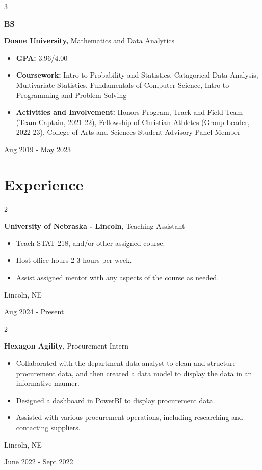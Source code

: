 \documentclass[10pt, letterpaper]{article}
\newenvironment{highlights}{
    \begin{itemize}[
        topsep=0.10 cm,
        parsep=0.10 cm,
        partopsep=0pt,
        itemsep=0pt,
        leftmargin=0.4 cm + 10pt
    ]
}{
    \end{itemize}
} %
\newenvironment{twocolentry}[2][]{
    \onecolentry
    \def\secondColumn{#2}
    \setcolumnwidth{\fill, 4.5 cm}
    \begin{paracol}{2}
}{
    \switchcolumn \raggedleft \secondColumn
    \end{paracol}
    \endonecolentry
} %
\newenvironment{threecolentry}[3][]{
    \onecolentry
    \def\thirdColumn{#3}
    \setcolumnwidth{1 cm, \fill, 4.5 cm}
    \begin{paracol}{3}
    {\raggedright #2} \switchcolumn
}{
    \switchcolumn \raggedleft \thirdColumn
    \end{paracol}
    \endonecolentry
} %
\begin{document}
        \vspace{0.2 cm}

                \begin{threecolentry}{\textbf{BS}}{
            Aug 2019 - May 2023
        }
            \textbf{Doane University, }Mathematics and Data Analytics
            \begin{highlights}
                \item \textbf{GPA:} 3.96/4.00
                \item \textbf{Coursework:} Intro to Probability and Statistics, Catagorical Data Analysis, Multivariate Statistics, Fundamentals of Computer Science, Intro to Programming and Problem Solving
                \item \textbf{Activities and Involvement:} Honors Program, Track and Field Team (Team Captain, 2021-22), Fellowship of Christian Athletes (Group Leader, 2022-23), College of Arts and Sciences Student Advisory Panel Member
            \end{highlights}
        \end{threecolentry}


    
    \section{Experience}

        \begin{twocolentry}{
            Lincoln, NE

        Aug 2024 - Present
        }
            \textbf{University of Nebraska - Lincoln}, Teaching Assistant
            \begin{highlights}
                \item Teach STAT 218, and/or other assigned course.
                \item Host office hours 2-3 hours per week.
                \item Assist assigned mentor with any aspects of the course as needed.
            \end{highlights}
        \end{twocolentry}
        
        \vspace{0.2 cm}

        
        \begin{twocolentry}{
            Lincoln, NE

        June 2022 - Sept 2022
        }
            \textbf{Hexagon Agility}, Procurement Intern
            \begin{highlights}
                \item Collaborated with the department data analyst to clean and structure procurement data, and then created a data model to display the data in an informative manner.
                \item Designed a dashboard in PowerBI to display procurement data.
                \item Assisted with various procurement operations, including researching and contacting suppliers.
            \end{highlights}
        \end{twocolentry}
\end{document}
